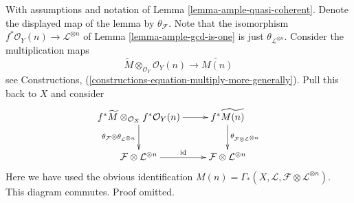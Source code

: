 \begin{remark}
\label{remark-neurotic}
With assumptions and notation of Lemma \ref{lemma-ample-quasi-coherent}.
Denote the displayed map of the lemma by $\theta_{\mathcal{F}}$.
Note that the isomorphism $f^*\mathcal{O}_Y(n) \to \mathcal{L}^{\otimes n}$
of Lemma \ref{lemma-ample-gcd-is-one} is just
$\theta_{\mathcal{L}^{\otimes n}}$.
Consider the multiplication maps 
$$
\widetilde{M} \otimes_{\mathcal{O}_Y} \mathcal{O}_Y(n) 
\longrightarrow
\widetilde{M(n)}
$$
see Constructions, (\ref{constructions-equation-multiply-more-generally}).
Pull this back to $X$ and consider
$$
\xymatrix{
f^*\widetilde{M} \otimes_{\mathcal{O}_X} f^*\mathcal{O}_Y(n)
\ar[r]
\ar[d]_{\theta_{\mathcal{F}} \otimes \theta_{\mathcal{L}^{\otimes n}}}
&
f^*\widetilde{M(n)}
\ar[d]^{\theta_{\mathcal{F}\otimes \mathcal{L}^{\otimes n}}}
\\
\mathcal{F} \otimes \mathcal{L}^{\otimes n} \ar[r]^{\text{id}} &
\mathcal{F} \otimes \mathcal{L}^{\otimes n}
}
$$
Here we have used the obvious identification
$M(n) = \Gamma_*(X, \mathcal{L}, \mathcal{F} \otimes \mathcal{L}^{\otimes n})$.
This diagram commutes. Proof omitted.
\end{remark}






















